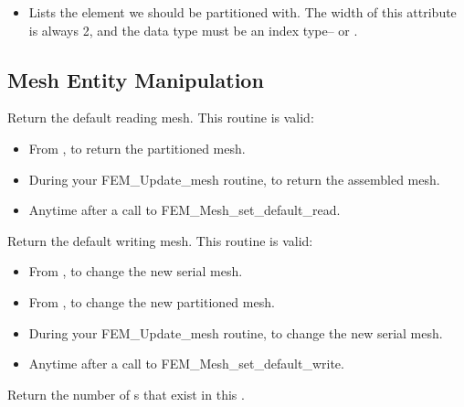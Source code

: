 \begin{itemize}
\item {} Lists the element we should be partitioned with.
    The width of this attribute is always 2, and the data type must
    be an index type-- or .
\end{itemize}



\subsection{Mesh Entity Manipulation}



Return the default reading mesh.  This routine is valid:

\begin{itemize}
\item From , to return the partitioned mesh.
\item During your FEM\_Update\_mesh routine, to return the assembled mesh.
\item Anytime after a call to FEM\_Mesh\_set\_default\_read.
\end{itemize}


Return the default writing mesh.  This routine is valid:

\begin{itemize}
\item From , to change the new serial mesh.
\item From , to change the new partitioned mesh.
\item During your FEM\_Update\_mesh routine, to change the new serial mesh.
\item Anytime after a call to FEM\_Mesh\_set\_default\_write.
\end{itemize}



Return the number of s that exist in this .

